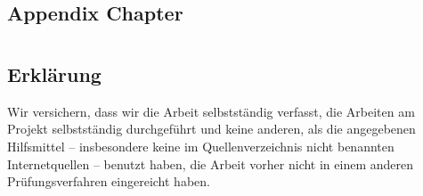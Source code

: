 \documentclass[
	12pt,
	a4paper,
	BCOR10mm,
	DIV14,
	listof=totoc,
	bibliography=totoc,
	headsepline
]{scrreprt}
\begin{document}
\nocite{*}



\listoffigures

\listoftables

\lstlistoflistings

\begin{appendices}

\chapter{Appendix Chapter}


\end{appendices}

\newpage

\thispagestyle{empty}

\chapter*{}

\section*{Erklärung}

Wir versichern, dass wir die Arbeit selbstständig verfasst, die Arbeiten am Projekt selbstständig durchgeführt und keine anderen, als die angegebenen Hilfsmittel -- insbesondere keine im Quellenverzeichnis nicht benannten Internetquellen -- benutzt haben, die Arbeit vorher nicht in einem anderen Prüfungsverfahren eingereicht haben.

\smallskip

\bigskip
\bigskip
\bigskip

\end{document}

